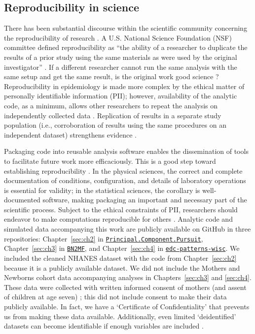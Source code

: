 \subsection{Reproducibility in science}\label{sec:repro}
There has been substantial discourse within the scientific community concerning the reproducibility of research \cite{baker20161}. A U.S. National Science Foundation (NSF) committee defined reproducibility as ``the ability of a researcher to duplicate the results of a prior study using the same materials as were used by the original investigator'' \cite{cacioppo2015social}. If a different researcher cannot run the same analysis with the same setup and get the same result, is the original work good science \cite{goodman2016does}? Reproducibility in epidemiology is made more complex by the ethical matter of personally identifiable information (PII); however, availability of the analytic code, as a minimum, allows other researchers to repeat the analysis on independently collected data \cite{peng2011reproducible}. Replication of results in a separate study population (i.e., corroboration of results using the same procedures on an independent dataset) strengthens evidence \cite{peng2006reproducible}.

Packaging code into reusable analysis software enables the dissemination of tools to facilitate future work more efficaciously. This is a good step toward establishing reproducibility \cite{collberg2015repeatability}. In the physical sciences, the correct and complete documentation of conditions, configuration, and details of laboratory operations is essential for validity; in the statistical sciences, the corollary is well-documented software, making packaging an important and necessary part of the scientific process. Subject to the ethical constraints of PII, researchers should endeavor to make computations reproducible for others \cite{barnes2010publish}. Analytic code and simulated data accompanying this work are publicly available on GitHub in three repositories: Chapter~\ref{sec:ch2} in \texttt{\href{https://github.com/lizzyagibson/Principal.Component.Pursuit}{Principal.Component.Pursuit}}, Chapter~\ref{sec:ch3} in \texttt{\href{https://github.com/lizzyagibson/BN2MF}{BN2MF}}, and Chapter~\ref{sec:ch4} in \texttt{\href{https://github.com/lizzyagibson/edc-patterns-wisc}{edc-patterns-wisc}}. We included the cleaned NHANES dataset with the code from Chapter~\ref{sec:ch2} because it is a publicly available dataset. We did not include the Mothers and Newborns cohort data accompanying analyses in Chapters~\ref{sec:ch3} and \ref{sec:ch4}. These data were collected with written informed consent of mothers (and assent of children at age seven) \cite{perera03}; this did not include consent to make their data publicly available. In fact, we have a `Certificate of Confidentiality' that prevents us from making these data available. Additionally, even limited `deidentified' datasets can become identifiable if enough variables are included \cite{narayanan2008robust}.


